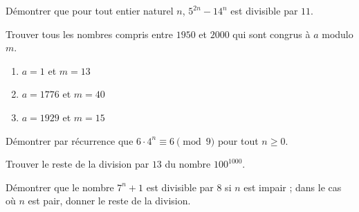 \begin{exstheorie}
	
	
	\eexo
	\pagebreak[3]
	
	
	\exo
	Démontrer que pour tout entier naturel $n$, $5^{2n} - 14^n$ est divisible par $11$.
	
	\eexo
	\pagebreak[3]
\end{exstheorie}

\begin{exstheorie}

\exo
Trouver tous les nombres compris entre $1950$ et $2000$ qui sont congrus à $a$ modulo $m$.

\begin{enumerate}[label=\roman*),left=0mm]
\item $a=1$ et $m=13$
\item $a=1776$ et $m=40$
\item $a=1929$ et $m=15$
\end{enumerate}


\eexo
\pagebreak[3]



\exo
Démontrer par récurrence que $6\cdot 4^n \equiv 6 \pmod{9}$ pour tout $n\geqslant 0$.



\eexo
\pagebreak[3]



\exo
Trouver le reste de la division par $13$ du nombre $100^{1000}$.


\eexo
\pagebreak[3]


\exo
Démontrer que le nombre $7^n+1$ est divisible par $8$ si $n$ est impair ; dans le cas où $n$ est pair, donner le reste de la division.
\end{exstheorie}


\medskip

